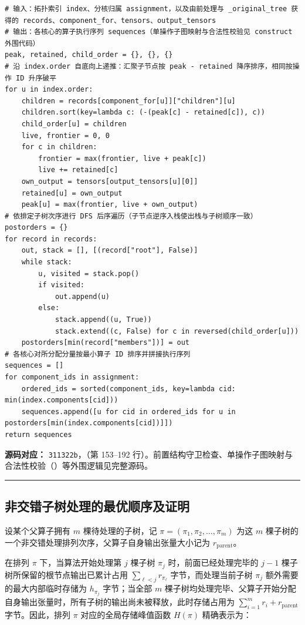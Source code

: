 \documentclass[anonymous,withtoc]{gmcm2026}
\begin{document}
\begin{lstlisting}[style=paperpseudo]
# 输入：拓扑索引 index、分核归属 assignment，以及由前处理与 _original_tree 获得的 records、component_for、tensors、output_tensors
# 输出：各核心的算子执行序列 sequences（单操作子图映射与合法性校验见 construct 外围代码）
peak, retained, child_order = {}, {}, {}
# 沿 index.order 自底向上递推：汇聚子节点按 peak - retained 降序排序，相同按操作 ID 升序破平
for u in index.order:
    children = records[component_for[u]]["children"][u]
    children.sort(key=lambda c: (-(peak[c] - retained[c]), c))
    child_order[u] = children
    live, frontier = 0, 0
    for c in children:
        frontier = max(frontier, live + peak[c])
        live += retained[c]
    own_output = tensors[output_tensors[u][0]]
    retained[u] = own_output
    peak[u] = max(frontier, live + own_output)
# 依排定子树次序进行 DFS 后序遍历（子节点逆序入栈使出栈与子树顺序一致）
postorders = {}
for record in records:
    out, stack = [], [(record["root"], False)]
    while stack:
        u, visited = stack.pop()
        if visited:
            out.append(u)
        else:
            stack.append((u, True))
            stack.extend((c, False) for c in reversed(child_order[u]))
    postorders[min(record["members"])] = out
# 各核心对所分配分量按最小算子 ID 排序并拼接执行序列
sequences = []
for component_ids in assignment:
    ordered_ids = sorted(component_ids, key=lambda cid: min(index.components[cid]))
    sequences.append([u for cid in ordered_ids for u in postorders[min(index.components[cid])]])
return sequences
\end{lstlisting}
\textbf{源码对应：} \texttt{311322b}，\texttt{}（第 153--192 行）。前置结构守卫检查、单操作子图映射与合法性校验（\texttt{}）等外围逻辑见完整源码。

\par\hrule\endgroup

\subsection{非交错子树处理的最优顺序及证明}

设某个父算子拥有 \(m\) 棵待处理的子树，记 \(\pi = (\pi_1, \pi_2, \dots, \pi_m)\) 为这 \(m\) 棵子树的一个非交错处理排列次序，父算子自身输出张量大小记为 \(r_{\mathrm{parent}}\)。

在排列 \(\pi\) 下，当算法开始处理第 \(j\) 棵子树 \(\pi_j\) 时，前面已经处理完毕的 \(j - 1\) 棵子树所保留的根节点输出已累计占用 \(\sum_{\ell < j} r_{\pi_\ell}\) 字节，而处理当前子树 \(\pi_j\) 额外需要的最大内部临时存储为 \(h_{\pi_j}\) 字节；当全部 \(m\) 棵子树均处理完毕、父算子开始分配自身输出张量时，所有子树的输出尚未被释放，此时存储占用为 \(\sum_{i=1}^m r_i + r_{\mathrm{parent}}\) 字节。因此，排列 \(\pi\) 对应的全局存储峰值函数 \(H(\pi)\) 精确表示为：
\end{document}
